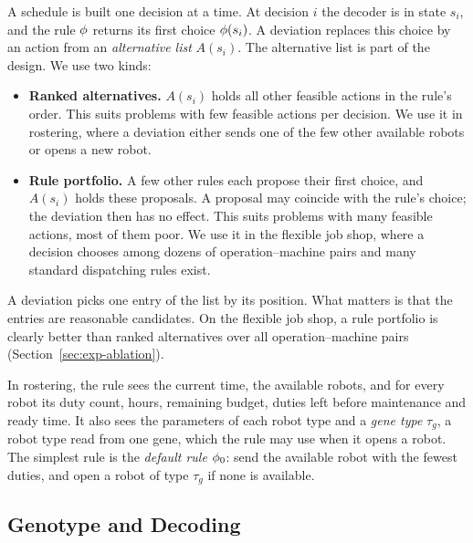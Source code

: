 A schedule is built one decision at a time.
At decision $i$ the decoder is in state $s_i$, and the rule $\phi$ returns its first choice $\phi(s_i)$.
A deviation replaces this choice by an action from an \emph{alternative list} $A(s_i)$.
The alternative list is part of the design.
We use two kinds:
\begin{itemize}
  \item \textbf{Ranked alternatives.} $A(s_i)$ holds all other feasible actions in the rule's order.
  This suits problems with few feasible actions per decision.
  We use it in rostering, where a deviation either sends one of the few other available robots or opens a new robot.
  \item \textbf{Rule portfolio.} A few other rules each propose their first choice, and $A(s_i)$ holds these proposals.
  A proposal may coincide with the rule's choice; the deviation then has no effect.
  This suits problems with many feasible actions, most of them poor.
  We use it in the flexible job shop, where a decision chooses among dozens of operation--machine pairs and many standard dispatching rules exist.
\end{itemize}
A deviation picks one entry of the list by its position.
What matters is that the entries are reasonable candidates.
On the flexible job shop, a rule portfolio is clearly better than ranked alternatives over all operation--machine pairs (Section~\ref{sec:exp-ablation}).

In rostering, the rule sees the current time, the available robots, and for every robot its duty count, hours, remaining budget, duties left before maintenance and ready time.
It also sees the parameters of each robot type and a \emph{gene type} $\tau_g$, a robot type read from one gene, which the rule may use when it opens a robot.
The simplest rule is the \emph{default rule} $\phi_0$: send the available robot with the fewest duties, and open a robot of type $\tau_g$ if none is available.

\subsection{Genotype and Decoding}
\label{sec:method:genotype}

